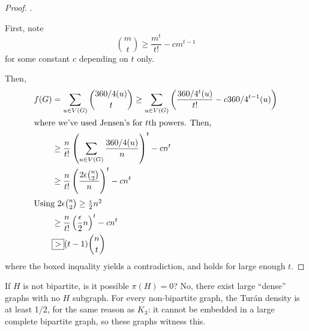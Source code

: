 \begin{proof}
.

First, note
\[
{m\choose t} \geq \frac{m^t}{t!} - cm^{t-1}
\]
for some constant $c$ depending on $t$ only.

Then,
\begin{align*}	
f(G) &= \sum_{u\in V(G)} {\deg (u) \choose t} \geq \sum_{u\in V(G)} \left( \frac{\deg^t(u)}{t!}- c \deg^{t-1}(u) \right)\\
\intertext{where we've used Jensen's for $t$th powers. Then,}
&\geq \frac{n}{t!} \left( \sum_{u\in V(G)} \frac{\deg(u)}{n} \right)^t - cn^t\\
&\geq \frac{n}{t!} \left( \frac{2 \epsilon {n\choose 2}}{n} \right)^t - cn^t\\
\intertext{Using $2 \epsilon {n\choose 2} \geq \frac{\epsilon}{2}n^2$}
&\geq \frac{n}{t!}\left( \frac{\epsilon}{2}n \right)^t - cn^t\\
& \boxed{>} (t-1) {n \choose t}
\end{align*}
where the boxed inquality yields a contradiction, and holds for large enough $t$.
\end{proof}


If $H$ is not bipartite, is it possible $\pi(H)=0$? No, there exist large ``dense'' graphs with no $H$ subgraph.
For every non-bipartite graph, the Tur\'an density is at least 1/2, for the same reason as $K_3$: it cannot be embedded in a large complete bipartite graph, so these graphs witness this.


